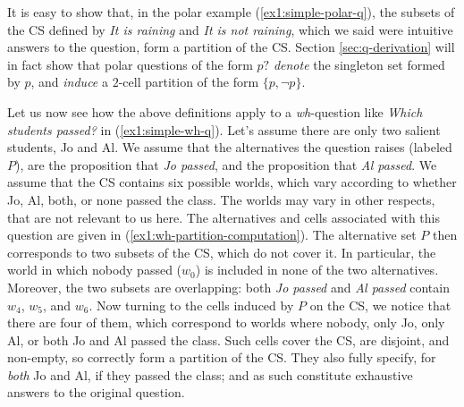 It is easy to show that, in the polar example (\ref{ex1:simple-polar-q}), the subsets of the CS defined by \textit{It is raining} and \textit{It is not raining}, which we said were intuitive answers to the question, form a partition of the CS. Section \ref{sec:q-derivation} will in fact show that polar questions of the form $p?$ \textit{denote} the singleton set formed by $p$, and \textit{induce} a $2$-cell partition of the form $\lbrace p, \neg p\rbrace$.


Let us now see how the above definitions apply to a \textit{wh}-question like \textit{Which students passed?} in (\ref{ex1:simple-wh-q}). Let's assume there are only two salient students, Jo and Al. We assume that the alternatives the question raises (labeled $P$), are the proposition that \textit{Jo passed}, and the proposition that \textit{Al passed}. We assume that the CS contains six possible worlds, which vary according to whether Jo, Al, both, or none passed the class. The worlds may vary in other respects, that are not relevant to us here. The alternatives and cells associated with this question are given in (\ref{ex1:wh-partition-computation}). The alternative set $P$ then corresponds to two subsets of the CS, which do not cover it. In particular, the world in which nobody passed ($w_0$) is included in none of the two alternatives. Moreover, the two subsets are overlapping: both \textit{Jo passed} and \textit{Al passed} contain $w_4$, $w_5$, and $w_6$. Now turning to the cells induced by $P$ on the CS, we notice that there are four of them, which correspond to worlds where nobody, only Jo, only Al, or both Jo and Al passed the class. Such cells cover the CS, are disjoint, and non-empty, so correctly form a partition of the CS. They also fully specify, for \textit{both} Jo and Al, if they passed the class; and as such constitute exhaustive answers to the original question.

